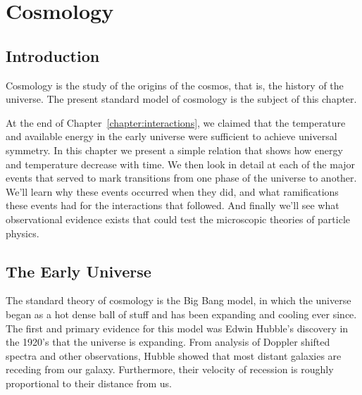 

\chapter{Cosmology}
\label{chapter:cosmology}


\section{Introduction}
\label{sec:cosmology_intro}

Cosmology is the study of the origins of the cosmos, that is, the
history of the universe.  The present standard model of cosmology is
the subject of this chapter.

At the end of Chapter~\ref{chapter:interactions}, we claimed that the
temperature and available energy in the early universe were sufficient
to achieve universal symmetry.  In this chapter we present a simple
relation that shows how energy and temperature decrease with time.  We
then look in detail at each of the major events that served to mark
transitions from one phase of the universe to another.  We'll learn
why these events occurred when they did, and what ramifications these
events had for the interactions that followed.  And finally we'll see
what observational evidence exists that could test the microscopic
theories of particle physics.

\section{The Early Universe}
\label{sec:early_universe}

The standard theory of cosmology is the Big Bang model, in which the
universe began as a hot dense ball of stuff and has been expanding and
cooling ever since.  The first and primary evidence for this model was
Edwin Hubble's discovery in the 1920's that the universe is expanding.
From analysis of Doppler shifted spectra and other observations,
Hubble showed that most distant galaxies are receding from our
galaxy. Furthermore, their velocity of recession is roughly
proportional to their distance from us.

